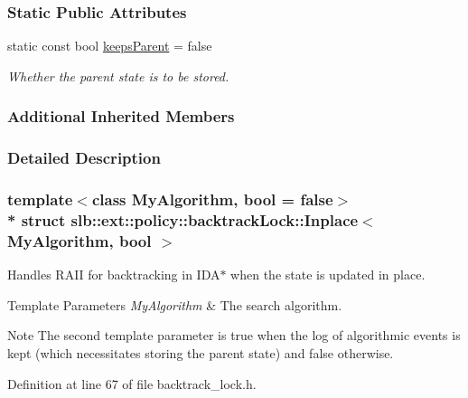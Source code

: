 \subsubsection*{Static Public Attributes}
\begin{DoxyCompactItemize}
\item 
static const bool \hyperlink{structslb_1_1ext_1_1policy_1_1backtrackLock_1_1Inplace_a5a7d3dfd27dbf3fecd5133837f2b63e3}{keeps\+Parent} = false\hypertarget{structslb_1_1ext_1_1policy_1_1backtrackLock_1_1Inplace_a5a7d3dfd27dbf3fecd5133837f2b63e3}{}\label{structslb_1_1ext_1_1policy_1_1backtrackLock_1_1Inplace_a5a7d3dfd27dbf3fecd5133837f2b63e3}

\begin{DoxyCompactList}\small\item\em Whether the parent state is to be stored. \end{DoxyCompactList}\end{DoxyCompactItemize}
\subsubsection*{Additional Inherited Members}


\subsubsection{Detailed Description}
\subsubsection*{template$<$class My\+Algorithm, bool = false$>$\\*
struct slb\+::ext\+::policy\+::backtrack\+Lock\+::\+Inplace$<$ My\+Algorithm, bool $>$}

Handles R\+A\+II for backtracking in I\+D\+A$\ast$ when the state is updated in place. 


\begin{DoxyTemplParams}{Template Parameters}
{\em My\+Algorithm} & The search algorithm. \\
\hline
\end{DoxyTemplParams}
\begin{DoxyNote}{Note}
The second template parameter is {\ttfamily true} when the log of algorithmic events is kept (which necessitates storing the parent state) and {\ttfamily false} otherwise. 
\end{DoxyNote}


Definition at line 67 of file backtrack\+\_\+lock.\+h.



